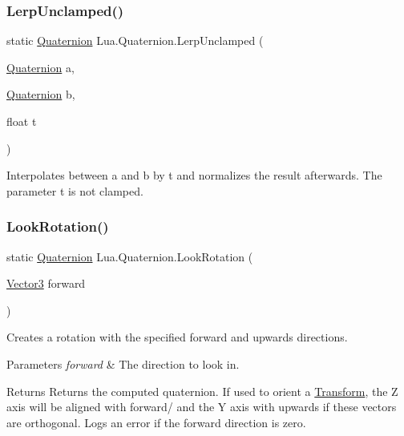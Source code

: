 \subsubsection{\texorpdfstring{LerpUnclamped()}{LerpUnclamped()}}
{\footnotesize\ttfamily static \mbox{\hyperlink{class_lua_1_1_quaternion}{Quaternion}} Lua.\+Quaternion.\+Lerp\+Unclamped (\begin{DoxyParamCaption}\item[{\mbox{\hyperlink{class_lua_1_1_quaternion}{Quaternion}}}]{a,  }\item[{\mbox{\hyperlink{class_lua_1_1_quaternion}{Quaternion}}}]{b,  }\item[{float}]{t }\end{DoxyParamCaption})\hspace{0.3cm}{\ttfamily [static]}}



Interpolates between a and b by t and normalizes the result afterwards. The parameter t is not clamped. 

\mbox{\label{class_lua_1_1_quaternion_a7a17f92fd9d83a8b472db78d5cb74642}} 
\subsubsection{\texorpdfstring{LookRotation()}{LookRotation()}\hspace{0.1cm}{\footnotesize\ttfamily [1/2]}}
{\footnotesize\ttfamily static \mbox{\hyperlink{class_lua_1_1_quaternion}{Quaternion}} Lua.\+Quaternion.\+Look\+Rotation (\begin{DoxyParamCaption}\item[{\mbox{\hyperlink{class_lua_1_1_vector3}{Vector3}}}]{forward }\end{DoxyParamCaption})\hspace{0.3cm}{\ttfamily [static]}}



Creates a rotation with the specified forward and upwards directions. 


\begin{DoxyParams}{Parameters}
{\em forward} & The direction to look in.\\
\hline
\end{DoxyParams}
\begin{DoxyReturn}{Returns}
Returns the computed quaternion. If used to orient a \mbox{\hyperlink{class_lua_1_1_transform}{Transform}}, the Z axis will be aligned with forward/ and the Y axis with upwards if these vectors are orthogonal. Logs an error if the forward direction is zero.
\end{DoxyReturn}
\mbox{\label{class_lua_1_1_quaternion_afa69beaa5748b6c941b9a3296d6c0638}} 
